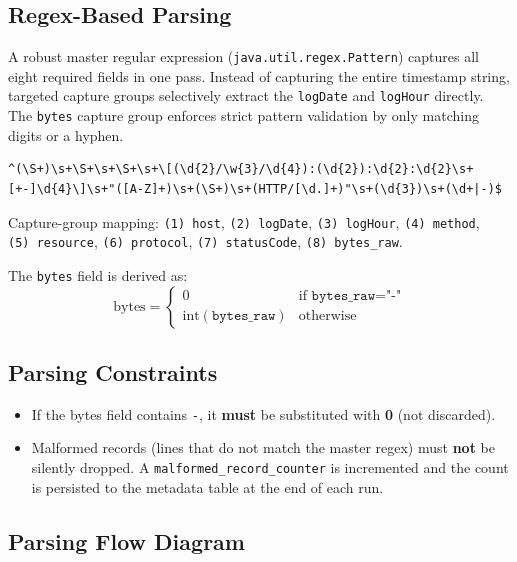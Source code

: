 \documentclass[11pt,a4paper]{article}
\begin{document}
\subsection{Regex-Based Parsing}

A robust master regular expression (\texttt{java.util.regex.Pattern}) captures all eight required fields in one pass. Instead of capturing the entire timestamp string, targeted capture groups selectively extract the \texttt{logDate} and \texttt{logHour} directly. The \texttt{bytes} capture group enforces strict pattern validation by only matching digits or a hyphen.

\begin{lstlisting}[style=regexstyle, caption={Master regular expression for log-line parsing}]
^(\S+)\s+\S+\s+\S+\s+\[(\d{2}/\w{3}/\d{4}):(\d{2}):\d{2}:\d{2}\s+[+-]\d{4}\]\s+"([A-Z]+)\s+(\S+)\s+(HTTP/[\d.]+)"\s+(\d{3})\s+(\d+|-)$
\end{lstlisting}

Capture-group mapping:
\texttt{(1)~host}, \texttt{(2)~logDate}, \texttt{(3)~logHour}, \texttt{(4)~method},
\texttt{(5)~resource}, \texttt{(6)~protocol}, \texttt{(7)~statusCode},
\texttt{(8)~bytes\_raw}.

The \texttt{bytes} field is derived as:
\[
  \text{bytes} =
  \begin{cases}
    0 & \text{if } \texttt{bytes\_raw} = \texttt{"-"} \\
    \text{int}(\texttt{bytes\_raw}) & \text{otherwise}
  \end{cases}
\]

\subsection{Parsing Constraints}

\begin{constraintbox}
\begin{itemize}
  \item If the bytes field contains \texttt{-}, it \textbf{must} be substituted with \textbf{0} (not discarded).
  \item Malformed records (lines that do not match the master regex) must \textbf{not} be silently dropped. A \texttt{malformed\_record\_counter} is incremented and the count is persisted to the metadata table at the end of each run.
\end{itemize}
\end{constraintbox}

\subsection{Parsing Flow Diagram}
\end{document}
